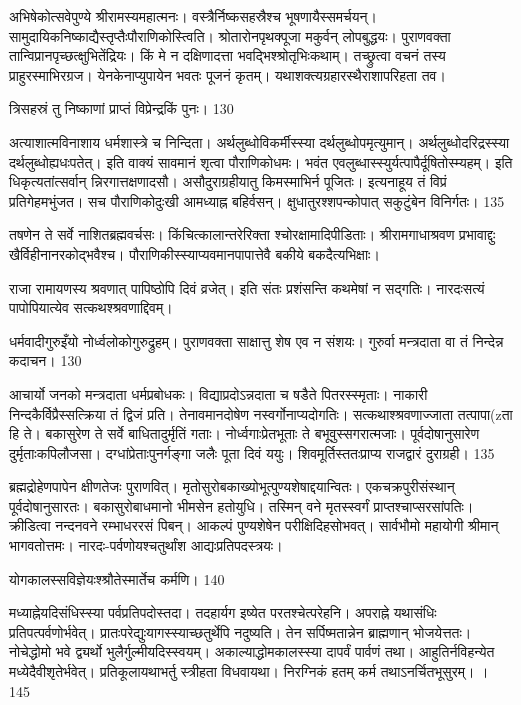 अभिषेकोत्सवेपुण्ये श्रीरामस्यमहात्मनः।
वस्त्रैर्निष्कसहस्रैश्च भूषणायैस्समर्चयन्।
सामुदायिकनिष्काद्यैस्तृप्तैःपौराणिकोस्त्विति।
श्रोतारोनपृथक्पूजा मकुर्वन् लोपबुद्धयः।
पुराणवक्ता तान्विप्रानपृच्छत्क्षुभितेंद्रियः।
किं मे न दक्षिणादत्ता भवद्भिश्श्रोतृभिःकथाम्।
तच्छ्रुत्वा वचनं तस्य प्राहुरस्माभिरग्रज।
येनकेनाप्युपायेन भवतः पूजनं कृतम्।
यथाशक्त्यग्रहारस्थैराशापरिहता तव।

त्रिसहस्रं तु निष्काणां प्राप्तं विप्रेन्द्रकिं पुनः।
130

अत्याशात्मविनाशाय धर्मशास्त्रे च निन्दिता।
अर्थलुब्धोविकर्मीस्स्या दर्थलुब्धोपमृत्युमान्।
अर्थलुब्धोदरिद्रस्स्या दर्थलुब्धोह्यधःपतेत्।
इति वाक्यं सावमानं शृत्वा पौराणिकोधमः।
भवंत एवलुब्धास्स्युर्यत्पापैर्दूषितोस्म्यहम्।
इति धिकृत्यतांत्सर्वान् न्निरगात्तक्षणादसौ।
असौदुराग्रहीयातु किमस्माभिर्न पूजितः।
इत्यनाहूय तं विप्रं प्रतिगेहमभुंजत।
सच पौराणिकोदुःखी आमध्याह्न बहिर्वसन्।
क्षुधातुरश्शपन्कोपात् सकुटुंबेन विनिर्गतः।
135

तषणेन ते सर्वे नाशितब्रह्मवर्चसः।
किंचित्कालान्तरेरिक्ता श्चोरक्षामादिपीडिताः।
श्रीरामगाधाश्रवण प्रभावाद्दुः
खैर्विहीनानरकोद्भवैश्च।
पौराणिकीस्स्याप्यवमानपापात्तेवै
बकीये बकदैत्यभिक्षाः।

राजा
रामायणस्य श्रवणात् पापिष्ठोपि दिवं व्रजेत्।
इति संतः प्रशंसन्ति कथमेषां न सद्गतिः।
नारदःसत्यं पापोपियात्येव सत्कथश्श्रवणाद्दिवम्।

धर्मवादीगुरुइँयो नोर्ध्वलोकोगुरुद्रुहम्।
पुराणवक्ता साक्षात्तु शेष एव न संशयः।
गुरुर्वा मन्त्रदाता वा तं निन्देन्न कदाचन।
130

आचार्यो जनको मन्त्रदाता धर्मप्रबोधकः।
विद्याप्रदोऽन्नदाता च षडैते पितरस्स्मृताः।
नाकारी निन्दकैर्विप्रैस्सत्क्रिया तं द्विजं प्रति।
तेनावमानदोषेण नस्वर्गोनाप्यदोगतिः।
सत्कथाश्श्रवणाज्जाता तत्पापा(zता हि ते।
बकासुरेण ते सर्वे बाधितादुर्मृतिं गताः।
नोर्ध्वगाःप्रेतभूताः ते बभूवुस्सगरात्मजाः।
पूर्वदोषानुसारेण दुर्मृताःकपिलौजसा।
दग्धांप्रेताःपुनर्गङ्गा जलैः पूता दिवं ययुः।
शिवमूर्तिस्ततःप्राप्य राजद्वारं दुराग्रही।
135

ब्रह्मद्रोहेणपापेन क्षीणतेजः पुराणवित्।
मृतोसुरोबकाख्योभूत्पुण्यशेषाद्दयान्वितः।
एकचक्रपुरीसंस्थान् पूर्वदोषानुसारतः।
बकासुरोबाधमानो भीमसेन हतोयुधि।
तस्मिन् वने मृतस्स्वर्गं प्राप्तश्चाप्सरसांपतिः।
क्रीडित्वा नन्दनवने रम्भाधररसं पिबन्।
आकल्पं पुण्यशेषेन परीक्षिदिहसोभवत्।
सार्वभौमो महायोगी श्रीमान् भागवतोत्तमः।
नारदः-पर्वणोयश्चतुर्थांश आद्यःप्रतिपदस्त्रयः।

योगकालस्सविज्ञेयःश्श्रौतेस्मार्तेच कर्मणि।
140

मध्याह्नेयदिसंधिस्स्या पर्वप्रतिपदोस्तदा।
तदहार्यग इष्येत परतश्चेत्परेहनि।
अपराह्ने यथासंधिः प्रतिपत्पर्वणोर्भवेत्।
प्रातःपरेद्युःयागस्स्याच्छतुर्थेपि नदुष्यति।
तेन सर्पिष्मतान्नेन ब्राह्मणान् भोजयेत्ततः।
नोचेद्धोमो भवे द्व्यर्थो भुलैर्गुल्मीयदिस्स्वयम्।
अकाल्याद्धोमकालस्स्या दापर्वं पार्वणं तथा।
आहुतिर्नविहन्येत मध्येदैवीशृतेर्भवेत्।
प्रतिकूलायथाभर्तु स्त्रीहता विधवायथा।
निरग्निकं हतम् कर्म तथाऽनर्चितभूसुरम्।
।
145

